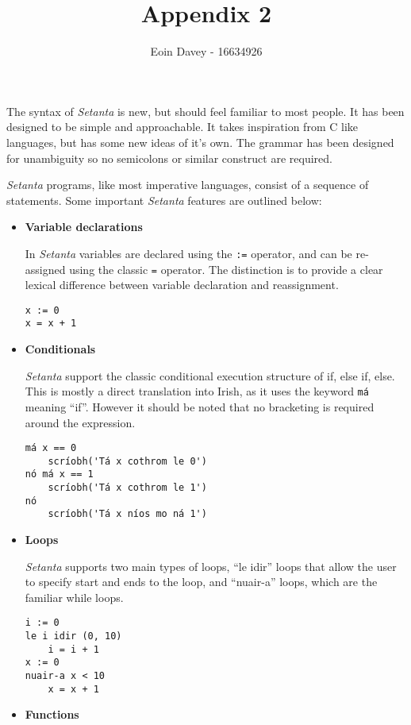 \documentclass[11pt]{extarticle}
\newcommand{\Setanta}{\emph{Setanta}}
\begin{document}
    \title{Appendix 2}
    \author{Eoin Davey - 16634926}
    \date{}
    \maketitle
    \thispagestyle{fancy}
The syntax of \Setanta{} is new, but should feel familiar to most people. It has been designed to be simple and approachable. It takes inspiration from C like languages, but has some new ideas of it's own.
The grammar has been designed for unambiguity so no semicolons or similar construct are required.

\Setanta{} programs, like most imperative languages, consist of a sequence of statements. Some important \Setanta{} features are outlined below:
\begin{itemize}
    \item \textbf{Variable declarations}

        In \Setanta{} variables are declared using the \verb|:=| operator, and can be re-assigned using the classic \verb|=| operator. The distinction is to provide a clear lexical difference between variable declaration and reassignment.

            \begin{lstlisting}[language=setanta, frame=single, caption=Variables]
x := 0
x = x + 1
            \end{lstlisting}
    \item \textbf{Conditionals}

        \Setanta{} support the classic conditional execution structure of if, else if, else. This is mostly a direct translation into Irish, as it uses the keyword \lstinline[language=setanta]|má| meaning ``if''. However it should be noted that no bracketing is required around the expression.

            \begin{lstlisting}[language=setanta, frame=single, caption=Setanta conditionals]
má x == 0
    scríobh('Tá x cothrom le 0')
nó má x == 1
    scríobh('Tá x cothrom le 1')
nó
    scríobh('Tá x níos mo ná 1')
            \end{lstlisting}
        \item \textbf{Loops}

            \Setanta{} supports two main types of loops, ``le idir'' loops that allow the user to specify start and ends to the loop, and ``nuair-a'' loops, which are the familiar while loops.

            \begin{lstlisting}[language=setanta, frame=single, caption=Setanta loops]
i := 0
le i idir (0, 10)
    i = i + 1
x := 0
nuair-a x < 10
    x = x + 1
            \end{lstlisting}
        \item \textbf{Functions}


\end{itemize}
\end{document}
